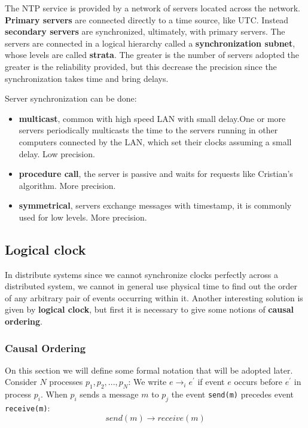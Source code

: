 \documentclass[11pt,a4paper]{article}
\begin{document}
The NTP service is provided by a network of servers located across the network. \textbf{Primary servers} are connected directly to a time source, like UTC. Instead \textbf{secondary servers} are synchronized, ultimately, with primary servers. The servers are connected in a logical hierarchy called a \textbf{synchronization subnet}, whose levels are called \textbf{strata}.
The greater is the number of servers adopted the greater is the reliability provided, but this decrease the precision since the synchronization takes time and bring delays.

Server synchronization can be done:
\begin{itemize}
	\item \textbf{multicast}, common with high speed LAN with small delay.One or more servers periodically multicasts the time to the servers running in other computers connected by the LAN, which set their clocks assuming a small delay. Low precision.
	\item \textbf{procedure call}, the server is passive and waits for requests like Cristian's algorithm. More precision.
	\item \textbf{symmetrical}, servers exchange messages with timestamp, it is commonly used for low levels. More precision.
\end{itemize}


\subsection{Logical clock}
In distribute systems since we cannot synchronize clocks perfectly across a distributed system, we cannot in general use physical time to find out the order of any arbitrary pair of events occurring within it. Another interesting solution is given by \textbf{logical clock}, but first it is necessary to give some notions of \textbf{causal ordering}.

\subsubsection{Causal Ordering}
On this section we will define some formal notation that will be adopted later.
Consider $N$ processes $p_1,p_2,..., p_N$:
We write $e \rightarrow_i e^\prime$ if event $e$ occurs before $e^\prime$ in process $p_i$.
When $p_i$ sends a message $m$ to $p_j$ the event  \verb!send(m)! precedes event \verb|receive(m)|:
$$send(m) \rightarrow receive(m)$$
\end{document}
